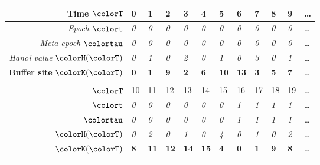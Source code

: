 \begin{figure}[htbp!]
  \centering

\begin{minipage}{\linewidth}
  \footnotesize
  \setlength{\tabcolsep}{2.5pt}
  \begin{tabularx}{\linewidth}{@{}r|*{11}{Y}@{}}

  { Time $\colorT$} &
    {0} & {1} & {2} & {3} & {4}
    & {5} & {6} & {7} & {8} & {9} & \ldots \\ \hline
  { \textit{Epoch} $\colort$} &
    \textit{0} & \textit{0} & \textit{0} & \textit{0} & \textit{0} & \textit{0} & \textit{0} & \textit{0} & \textit{0} & \textit{0} & \ldots \\
  { \textit{Meta-epoch} $\colortau$} &
    \textit{0} & \textit{0} & \textit{0} & \textit{0} & \textit{0} & \textit{0} & \textit{0} & \textit{0} & \textit{0} & \textit{0} & \ldots \\
  { \footnotesize \textit{Hanoi value} $\colorH(\colorT)$} &
    \textit{0} & \textit{1} & \textit{0} & \textit{2} & \textit{0} & \textit{1} & \textit{0} & \textit{3} & \textit{0} & \textit{1} & \ldots \\
  { \footnotesize \textbf{Buffer site} $\colorK(\colorT)$} &
    \textbf{0} & \textbf{1} & \textbf{9} & \textbf{2} & \textbf{6} & \textbf{10}
    & \textbf{13} & \textbf{3} & \textbf{5} & \textbf{7} & \ldots \\
   \\[1ex]

  { $\colorT$} &
    {10} & {11} & {12} & {13} & {14}
    & {15} & {16} & {17} & {18} & {19} & \ldots \\ \hline
  { $\colort$} &
    \textit{0} & \textit{0} & \textit{0} & \textit{0} & \textit{0} & \textit{0} & \textit{1} & \textit{1} & \textit{1} & \textit{1} & \ldots \\
  { $\colortau$} &
    \textit{0} & \textit{0} & \textit{0} & \textit{0} & \textit{0} & \textit{0} & \textit{1} & \textit{1} & \textit{1} & \textit{1} & \ldots \\
  { $\colorH(\colorT)$} &
    \textit{0} & \textit{2} & \textit{0} & \textit{1} & \textit{0} & \textit{4} & \textit{0} & \textit{1} & \textit{0} & \textit{2} & \ldots \\
  { $\colorK(\colorT)$} &
    \textbf{8} & \textbf{11} & \textbf{12} & \textbf{14} & \textbf{15}
    & \textbf{4} & \textbf{0} & \textbf{1} & \textbf{9} & \textbf{8} & \ldots \\
   \\[1ex]


\end{tabularx}
\end{minipage}
\end{figure}

